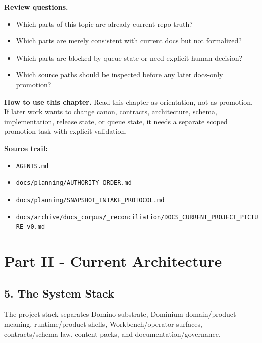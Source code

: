 \documentclass[10.5pt,a4paper,openany]{book}
\begin{document}
\textbf{Review questions.}


\begin{itemize}
\item Which parts of this topic are already current repo truth?
\item Which parts are merely consistent with current docs but not formalized?
\item Which parts are blocked by queue state or need explicit human decision?
\item Which source paths should be inspected before any later docs-\allowbreak{}only promotion?
\end{itemize}

\textbf{How to use this chapter.} Read this chapter as orientation, not as promotion.\allowbreak{} If later work wants to change canon, contracts, architecture, schema, implementation, release state, or queue state, it needs a separate scoped promotion task with explicit validation.\allowbreak{}


\textbf{Source trail:}


\begin{itemize}
\item \texttt{AGENTS.\allowbreak{}md}
\item \texttt{docs/\allowbreak{}planning/\allowbreak{}AUTHORITY\_\allowbreak{}ORDER.\allowbreak{}md}
\item \texttt{docs/\allowbreak{}planning/\allowbreak{}SNAPSHOT\_\allowbreak{}INTAKE\_\allowbreak{}PROTOCOL.\allowbreak{}md}
\item \texttt{docs/\allowbreak{}archive/\allowbreak{}docs\_\allowbreak{}corpus/\allowbreak{}\_\allowbreak{}reconciliation/\allowbreak{}DOCS\_\allowbreak{}CURRENT\_\allowbreak{}PROJECT\_\allowbreak{}PICTURE\_\allowbreak{}v0.\allowbreak{}md}
\end{itemize}


\chapter{Part II - Current Architecture}


\section{5. The System Stack}

The project stack separates Domino substrate, Dominium domain/\allowbreak{}product meaning, runtime/\allowbreak{}product shells, Workbench/\allowbreak{}operator surfaces, contracts/\allowbreak{}schema law, content packs, and documentation/\allowbreak{}governance.\allowbreak{}
\end{document}

